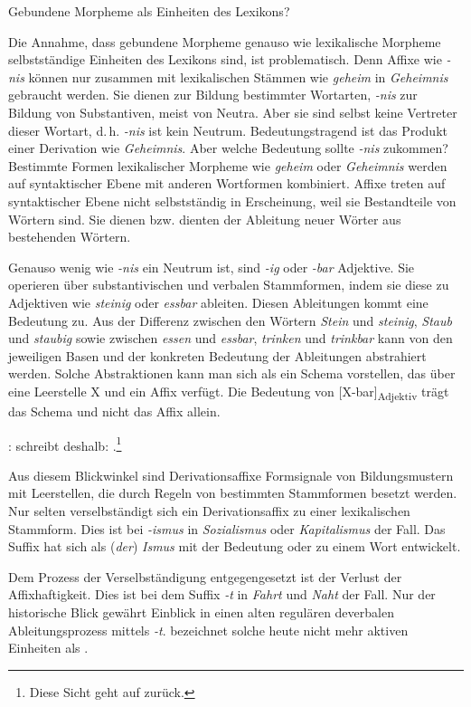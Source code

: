 \begin{Exkurs}{Gebundene Morpheme als Einheiten des Lexikons?}
\label{ExkursMorphemLexikon}

Die Annahme, dass gebundene Morpheme genauso wie lexikalische Morpheme selbstständige Einheiten des Lexikons sind, ist problematisch.
Denn Affixe wie \textit{-nis} können nur zusammen mit lexikalischen Stämmen wie \textit{geheim} in \textit{Geheimnis} gebraucht werden. Sie dienen zur Bildung bestimmter Wortarten, \textit{-nis} zur Bildung von Substantiven, meist von Neutra. Aber sie sind selbst keine Vertreter dieser Wortart, d.\,h. \textit{-nis} ist kein Neutrum. Bedeutungstragend ist das Produkt einer Derivation wie \textit{Geheimnis}. Aber welche Bedeutung sollte \textit{-nis} zukommen? Bestimmte Formen lexikalischer Morpheme wie \textit{geheim} oder \textit{Geheimnis} werden auf syntaktischer Ebene mit anderen Wortformen kombiniert. Affixe treten auf syntaktischer Ebene nicht selbstständig in Erscheinung, weil sie Bestandteile von Wörtern sind. Sie dienen bzw. dienten der Ableitung neuer Wörter aus bestehenden Wörtern. 

Genauso wenig wie \textit{-nis} ein Neutrum ist, sind \textit{-ig} oder \textit{-bar} Adjektive. Sie operieren über substantivischen und verbalen Stammformen, indem sie diese zu Adjektiven wie \textit{steinig} oder \textit{essbar} ableiten. Diesen Ableitungen kommt eine Bedeutung zu. Aus der Differenz zwischen den Wörtern \textit{Stein} und \textit{steinig}, \textit{Staub} und \textit{staubig} sowie zwischen \textit{essen} und \textit{essbar}, \textit{trinken} und \textit{trinkbar} kann von den jeweiligen Basen und der konkreten Bedeutung der Ableitungen abstrahiert werden. Solche Abstraktionen kann man sich als ein Schema vorstellen, das über eine Leerstelle X und ein Affix verfügt. Die Bedeutung von [X-bar]\textsubscript{Adjektiv} trägt das Schema und nicht das Affix allein.

\citet[12]{Motsch2004}: schreibt deshalb: .\footnote{Diese Sicht geht auf \citet[47]{Paul1920Wb} zurück.}

Aus diesem Blickwinkel sind Derivationsaffixe Formsignale von Bildungsmustern mit Leerstellen, die durch Regeln von bestimmten Stammformen besetzt werden. Nur selten verselbständigt sich ein Derivationsaffix zu einer lexikalischen Stammform. Dies ist \zB bei \textit{-ismus} in \textit{Sozialismus} oder \textit{Kapitalismus} der Fall. Das Suffix hat sich als (\textit{der}) \textit{Ismus} mit der Bedeutung  oder  zu einem Wort entwickelt.

Dem Prozess der Verselbständigung entgegengesetzt ist der Verlust der Affixhaftigkeit. Dies ist \zB bei dem Suffix \textit{-t} in \textit{Fahrt} und \textit{Naht} der Fall. Nur der historische Blick gewährt Einblick in einen alten regulären deverbalen Ableitungsprozess mittels \textit{-t}. \citet[228]{Eisenberg2020_Wort} bezeichnet solche heute nicht mehr aktiven Einheiten als .    

\end{Exkurs}



